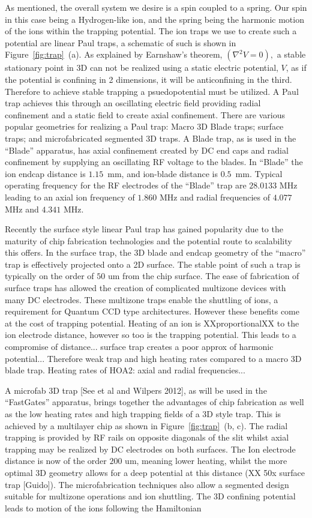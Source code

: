 \documentclass[12pt]{iopart}
\begin{document}
As mentioned, the overall system we desire is a spin coupled to a
spring. Our spin in this case being a Hydrogen-like ion, and the
spring being the harmonic motion of the ions within the trapping
potential. The ion traps we use to create such a potential are linear
Paul traps, a schematic of such is shown in Figure~\ref{fig:trap}~(a). As explained by
Earnshaw's theorem, $(\nabla^2 V = 0),$
a stable stationary point in 3D can not be realized using a static
electric potential, $V$, as if the potential is confining in 2
dimensions, it will be anticonfining in the third. Therefore to
achieve stable trapping a psuedopotential must be utilized.
A Paul trap achieves this through an oscillating electric field
providing radial confinement and a static field to create axial
confinement. There are various popular geometries for realizing a Paul
trap: Macro 3D Blade traps; surface traps; and microfabricated
segmented 3D traps.  A Blade trap, as is used in the ``Blade''
apparatus, has axial confinement created by DC end caps and radial
confinement by supplying an oscillating RF voltage to the blades. In
``Blade'' the ion endcap distance is $1.15$~mm, and ion-blade distance
is $0.5$~mm. Typical operating frequency for the RF electrodes of the
``Blade'' trap are $28.0133$ MHz leading to an axial ion frequency of
$1.860$ MHz and radial frequencies of $4.077$ MHz and $4.341$ MHz.

Recently the surface style linear Paul
trap has gained popularity due to the maturity of chip fabrication
technologies and the potential route to scalability this offers. In
the surface trap, the 3D blade and endcap geometry of the ``macro''
trap is effectively projected onto a 2D surface. The stable point of
such a trap is typically on the order of $50$ um from the chip
surface. The ease of fabrication of surface traps has allowed the
creation of complicated multizone devices with many DC electrodes.
These multizone traps enable the shuttling of ions, a requirement for
Quantum CCD type architectures. However these benefits come at the
cost of trapping potential. Heating of an ion is XXproportionalXX to
the ion electrode distance, however so too is the trapping
potential. This leads to a compromise of distance... surface trap
creates a poor approx of harmonic potential... Therefore weak trap and
high heating rates compared to a macro 3D blade trap. Heating rates of
HOA2: axial and radial frequencies...

A microfab 3D trap [See et al and Wilpers 2012], as will be used in
the ``FastGates'' apparatus, brings together the advantages of chip
fabrication as well as the low heating rates and high trapping fields
of a 3D style trap. This is achieved by a multilayer chip as shown in
Figure~\ref{fig:trap}~(b, c). The radial trapping is provided by RF rails on opposite
diagonals of the slit whilst axial trapping may be realized by DC
electrodes on both surfaces. The Ion electrode distance is now of the
order $200$ um, meaning lower heating, whilst the more optimal 3D
geometry allows for a deep potential at this distance (XX 50x surface trap [Guido]). The
microfabrication techniques also allow a segmented design suitable for
multizone operations and ion shuttling.  The 3D confining potential
leads to motion of the ions following the Hamiltonian
\end{document}
